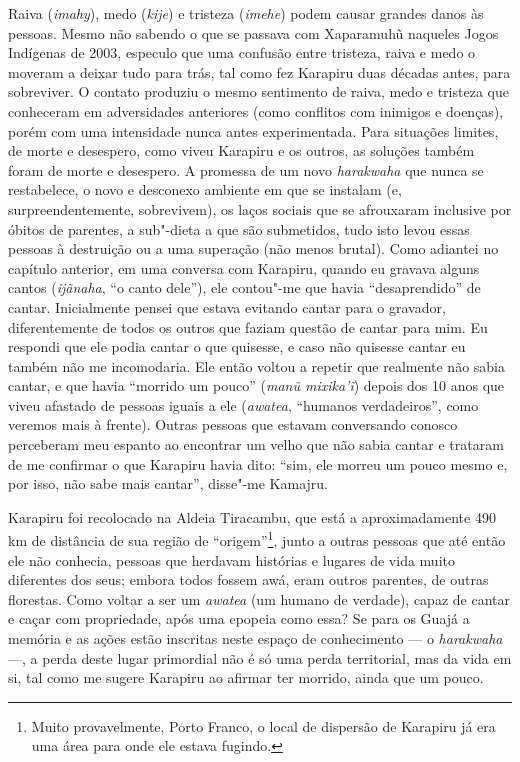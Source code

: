 Raiva (\emph{imahy}), medo (\emph{kije}) e tristeza (\emph{imehe}) podem
causar grandes danos às pessoas. Mesmo não sabendo o que se passava com
Xaparamuhũ naqueles Jogos Indígenas de 2003, especulo que uma confusão
entre tristeza, raiva e medo o moveram a deixar tudo para trás, tal como
fez Karapiru duas décadas antes, para sobreviver. O contato produziu o
mesmo sentimento de raiva, medo e tristeza que conheceram em
adversidades anteriores (como conflitos com inimigos e doenças), porém
com uma intensidade nunca antes experimentada. Para situações limites,
de morte e desespero, como viveu Karapiru e os outros, as soluções
também foram de morte e desespero. A promessa de um novo
\emph{harakwaha} que nunca se restabelece, o novo e desconexo ambiente
em que se instalam (e, surpreendentemente, sobrevivem), os laços sociais
que se afrouxaram inclusive por óbitos de parentes, a sub"-dieta a que
são submetidos, tudo isto levou essas pessoas à destruição ou a uma
superação (não menos brutal). Como adiantei no capítulo anterior, em uma
conversa com Karapiru, quando eu gravava alguns cantos (\emph{ijãnaha},
``o canto dele''), ele contou"-me que havia ``desaprendido'' de cantar.
Inicialmente pensei que estava evitando cantar para o gravador,
diferentemente de todos os outros que faziam questão de cantar para mim.
Eu respondi que ele podia cantar o que quisesse, e caso não quisesse
cantar eu também não me incomodaria. Ele então voltou a repetir que
realmente não sabia cantar, e que havia ``morrido um pouco'' (\emph{manũ
mixika'ĩ}) depois dos 10 anos que viveu afastado de pessoas iguais a ele
(\emph{awatea}, ``humanos verdadeiros'', como veremos mais à frente).
Outras pessoas que estavam conversando conosco perceberam meu espanto ao
encontrar um velho que não sabia cantar e trataram de me confirmar o que
Karapiru havia dito: ``sim, ele morreu um pouco mesmo e, por isso, não
sabe mais cantar'', disse"-me Kamajru.

Karapiru foi recolocado na Aldeia Tiracambu, que está a aproximadamente
490 km de distância de sua região de ``origem''\footnote{Muito
  provavelmente, Porto Franco, o local de dispersão de Karapiru já era
  uma área para onde ele estava fugindo.}, junto a outras pessoas que
até então ele não conhecia, pessoas que herdavam histórias e lugares de
vida muito diferentes dos seus; embora todos fossem awá, eram
outros parentes, de outras florestas. Como voltar a ser um \emph{awatea}
(um humano de verdade), capaz de cantar e caçar com propriedade, após
uma epopeia como essa? Se para os Guajá a memória e as ações estão
inscritas neste espaço de conhecimento --- o \emph{harakwaha} ---, a perda
deste lugar primordial não é só uma perda territorial, mas da vida em
si, tal como me sugere Karapiru ao afirmar ter morrido, ainda que um
pouco.

